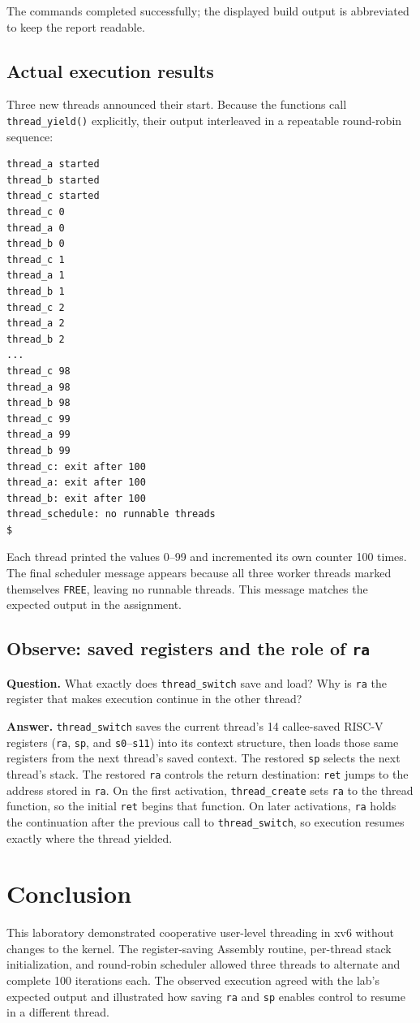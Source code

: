 \documentclass[12pt,a4paper]{article}
\begin{document}
The commands completed successfully; the displayed build output is abbreviated to keep the report readable.

\subsection{Actual execution results}
Three new threads announced their start. Because the functions call \texttt{thread\_yield()} explicitly, their output interleaved in a repeatable round-robin sequence:

\begin{lstlisting}[style=terminal]
thread_a started
thread_b started
thread_c started
thread_c 0
thread_a 0
thread_b 0
thread_c 1
thread_a 1
thread_b 1
thread_c 2
thread_a 2
thread_b 2
...
thread_c 98
thread_a 98
thread_b 98
thread_c 99
thread_a 99
thread_b 99
thread_c: exit after 100
thread_a: exit after 100
thread_b: exit after 100
thread_schedule: no runnable threads
$
\end{lstlisting}

Each thread printed the values 0--99 and incremented its own counter 100 times. The final scheduler message appears because all three worker threads marked themselves \texttt{FREE}, leaving no runnable threads. This message matches the expected output in the assignment.

\subsection{Observe: saved registers and the role of \texttt{ra}}
\noindent\textbf{Question.} What exactly does \texttt{thread\_switch} save and load? Why is \texttt{ra} the register that makes execution continue in the other thread?

\medskip
\noindent\textbf{Answer.} \texttt{thread\_switch} saves the current thread's 14 callee-saved RISC-V registers (\texttt{ra}, \texttt{sp}, and \texttt{s0}--\texttt{s11}) into its context structure, then loads those same registers from the next thread's saved context. The restored \texttt{sp} selects the next thread's stack. The restored \texttt{ra} controls the return destination: \texttt{ret} jumps to the address stored in \texttt{ra}. On the first activation, \texttt{thread\_create} sets \texttt{ra} to the thread function, so the initial \texttt{ret} begins that function. On later activations, \texttt{ra} holds the continuation after the previous call to \texttt{thread\_switch}, so execution resumes exactly where the thread yielded.

\section{Conclusion}
This laboratory demonstrated cooperative user-level threading in xv6 without changes to the kernel. The register-saving Assembly routine, per-thread stack initialization, and round-robin scheduler allowed three threads to alternate and complete 100 iterations each. The observed execution agreed with the lab's expected output and illustrated how saving \texttt{ra} and \texttt{sp} enables control to resume in a different thread.
\end{document}
